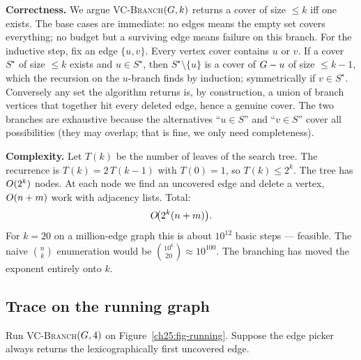 \begin{whybox}
\textbf{Correctness.} We argue \textsc{VC-Branch}$(G,k)$ returns a cover of size $\le k$ iff one exists. The base cases are immediate: no edges means the empty set covers everything; no budget but a surviving edge means failure on this branch. For the inductive step, fix an edge $\{u,v\}$. Every vertex cover contains $u$ or $v$. If a cover $S^\star$ of size $\le k$ exists and $u\in S^\star$, then $S^\star\setminus\{u\}$ is a cover of $G-u$ of size $\le k-1$, which the recursion on the $u$-branch finds by induction; symmetrically if $v\in S^\star$. Conversely any set the algorithm returns is, by construction, a union of branch vertices that together hit every deleted edge, hence a genuine cover. The two branches are exhaustive because the alternatives ``$u\in S$'' and ``$v\in S$'' cover all possibilities (they may overlap; that is fine, we only need completeness).
\end{whybox}

\begin{whybox}
\textbf{Complexity.} Let $T(k)$ be the number of leaves of the search tree. The recurrence is $T(k) = 2\,T(k-1)$ with $T(0)=1$, so $T(k)\le 2^k$. The tree has $O(2^k)$ nodes. At each node we find an uncovered edge and delete a vertex, $O(n+m)$ work with adjacency lists. Total:
\[
  O\!\big(2^k (n+m)\big).
\]
For $k=20$ on a million-edge graph this is about $10^{12}$ basic steps --- feasible. The naive $\binom{n}{k}$ enumeration would be $\binom{10^6}{20}\approx 10^{100}$. The branching has moved the exponent entirely onto $k$.
\end{whybox}

\subsection{Trace on the running graph}

Run \textsc{VC-Branch}$(G,4)$ on Figure~\ref{ch25:fig-running}. Suppose the edge picker always returns the lexicographically first uncovered edge.

